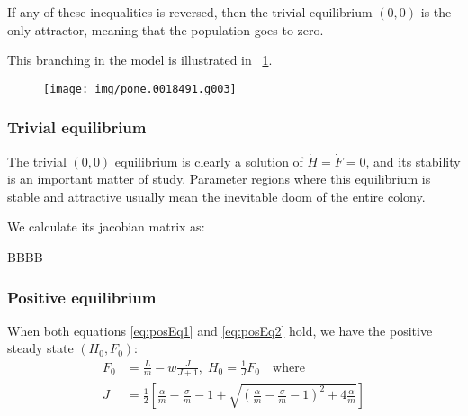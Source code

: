 If any of these inequalities is reversed, then the trivial equilibrium $(0,0)$ is the only attractor, meaning that the population goes to zero.

This branching in the model is illustrated in \figurename~\ref{img:kh11phasePlane}.

\begin{figure}[pbh]
    \centering
    \texttt{[image: img/pone.0018491.g003]}

    \caption[\figurename~3 from \parencite{khoury2011}]{
    }

    \label{img:kh11phasePlane}
\end{figure}

\subsubsection{Trivial equilibrium}
The trivial $(0,0)$ equilibrium is clearly a solution of $\dot{H}=\dot{F}=0$, and its stability is an important matter of study. Parameter regions where this equilibrium is stable and attractive usually mean the inevitable doom of the entire colony.

We calculate its jacobian matrix as:

BBBB

\subsubsection{Positive equilibrium}
When both equations \eqref{eq:posEq1} and \eqref{eq:posEq2} hold, we have the positive steady state $(H_0, F_0)$:
\begin{align}
    F_0 &= \frac{L}{m} -w \frac{J}{J+1}, \; H_0 = \frac{1}{J} F_0 \quad \text{where}
    \label{eq:kh11posEqJSol} \\
    J &= \frac{1}{2} \left[
    \frac{\alpha}{m} - \frac{\sigma}{m} - 1 +
    \sqrt{ {\left( \frac{\alpha}{m} - \frac{\sigma}{m} - 1 \right)}^2
        + 4 \frac{\alpha}{m}
    }
    \right]
    \label{eq:kh11posEqJ}
\end{align}

